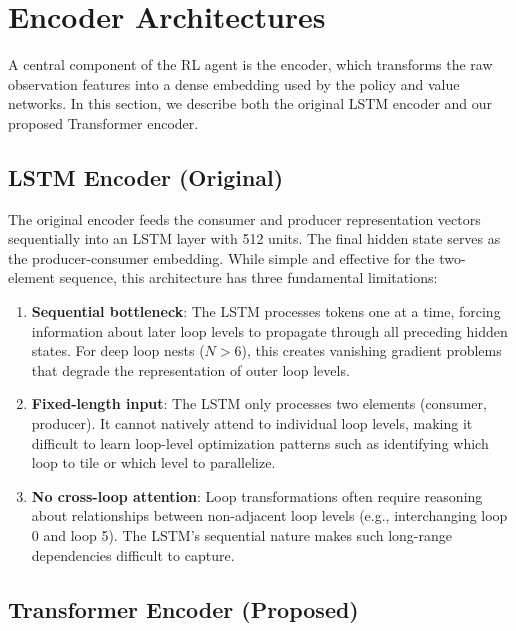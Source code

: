 \documentclass[10pt,twocolumn]{article}
\begin{document}
\section{Encoder Architectures}
\label{sec:encoder}

A central component of the RL agent is the encoder, which transforms the raw observation features into a dense embedding used by the policy and value networks. In this section, we describe both the original LSTM encoder and our proposed Transformer encoder.

\subsection{LSTM Encoder (Original)}

The original encoder feeds the consumer and producer representation vectors sequentially into an LSTM layer with 512 units. The final hidden state serves as the producer-consumer embedding. While simple and effective for the two-element sequence, this architecture has three fundamental limitations:

\begin{enumerate}
\item \textbf{Sequential bottleneck}: The LSTM processes tokens one at a time, forcing information about later loop levels to propagate through all preceding hidden states. For deep loop nests ($N > 6$), this creates vanishing gradient problems that degrade the representation of outer loop levels.

\item \textbf{Fixed-length input}: The LSTM only processes two elements (consumer, producer). It cannot natively attend to individual loop levels, making it difficult to learn loop-level optimization patterns such as identifying which loop to tile or which level to parallelize.

\item \textbf{No cross-loop attention}: Loop transformations often require reasoning about relationships between non-adjacent loop levels (e.g., interchanging loop 0 and loop 5). The LSTM's sequential nature makes such long-range dependencies difficult to capture.
\end{enumerate}

\subsection{Transformer Encoder (Proposed)}
\label{sec:transformer}
\end{document}
